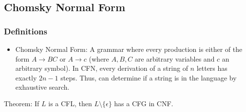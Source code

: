 \subsection{\color{ForestGreen}Chomsky Normal Form}
\subsubsection{Definitions}
\begin{itemize}
    \item {Chomsky Normal Form}: A grammar where
every production is either of the form $A \rightarrow BC$
or $A \rightarrow c$ (where $A, B, C$ are arbitrary variables
and $c$ an arbitrary symbol). In CFN, every derivation of a string of $n$ letters has
exactly $2n-1$ steps. Thus, can determine if a string is in the language by exhaustive search.
\end{itemize}
Theorem: If $L$ is a CFL, then $L \setminus \{\epsilon\}$ has a CFG in CNF.
